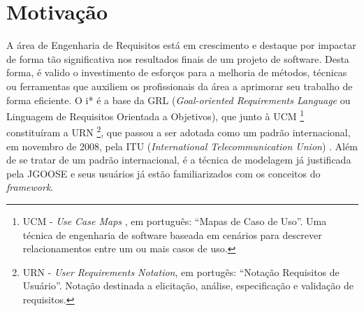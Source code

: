     \section{Motivação}
        \label{cap:introducao:sec:motivacao}
            A área de Engenharia de Requisitos está em crescimento e destaque
            por impactar de forma tão significativa nos resultados finais de um projeto de software.
            Desta forma,
            é valido o investimento de esforços para a melhoria de métodos, técnicas ou ferramentas que auxiliem os profissionais da área a aprimorar seu trabalho de forma eficiente.
                    O i* é a base da GRL (\emph{Goal-oriented Requirements Language} ou Linguagem de Requisitos Orientada a Objetivos),
                    que junto à UCM
                        \footnote{UCM - \emph{Use Case Maps} , em português: ``Mapas de Caso de Uso''. Uma técnica de engenharia de software baseada em cenários para descrever relacionamentos entre um ou mais casos de uso.}
                    constituíram a URN
                        \footnote{URN - \emph{User Requirements Notation}, em portugês: ``Notação Requisitos de Usuário''. Notação destinada a elicitação, análise, especificação e validação de requisitos.},
                    que passou a ser adotada como um padrão internacional,
                    em novembro de 2008,
                    pela ITU (\emph{International Telecommunication Union})
                        \cite{amyot2003introduction}
                        \cite{itu2003urn}. %
                    Além de se tratar de um padrão internacional,
                    é a técnica de modelagem já justificada pela JGOOSE
                    e seus usuários já estão familiarizados com os conceitos do \emph{framework}.

